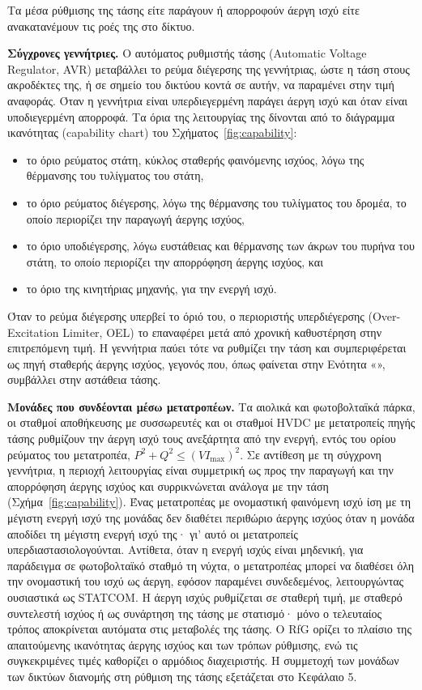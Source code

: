 Τα μέσα ρύθμισης της τάσης είτε παράγουν ή απορροφούν άεργη ισχύ είτε ανακατανέμουν τις ροές
της στο δίκτυο.

\textbf{Σύγχρονες γεννήτριες.} Ο αυτόματος ρυθμιστής τάσης (Automatic Voltage Regulator, AVR)
μεταβάλλει το ρεύμα διέγερσης της γεννήτριας, ώστε η τάση στους ακροδέκτες της, ή σε σημείο
του δικτύου κοντά σε αυτήν, να παραμένει στην τιμή αναφοράς. Όταν η γεννήτρια είναι
υπερδιεγερμένη παράγει άεργη ισχύ και όταν είναι υποδιεγερμένη απορροφά. Τα όρια της
λειτουργίας της δίνονται από το διάγραμμα ικανότητας (capability chart) του
Σχήματος~\ref{fig:capability}:

\begin{itemize}
\item το όριο ρεύματος στάτη, κύκλος σταθερής φαινόμενης ισχύος, λόγω της θέρμανσης του
      τυλίγματος του στάτη,
\item το όριο ρεύματος διέγερσης, λόγω της θέρμανσης του τυλίγματος του δρομέα, το οποίο
      περιορίζει την παραγωγή άεργης ισχύος,
\item το όριο υποδιέγερσης, λόγω ευστάθειας και θέρμανσης των άκρων του πυρήνα του στάτη, το
      οποίο περιορίζει την απορρόφηση άεργης ισχύος, και
\item το όριο της κινητήριας μηχανής, για την ενεργή ισχύ.
\end{itemize}

Όταν το ρεύμα διέγερσης υπερβεί το όριό του, ο περιοριστής υπερδιέγερσης (Over-Excitation
Limiter, OEL) το επαναφέρει μετά από χρονική καθυστέρηση στην επιτρεπόμενη τιμή. Η γεννήτρια
παύει τότε να ρυθμίζει την τάση και συμπεριφέρεται ως πηγή σταθερής άεργης ισχύος, γεγονός που,
όπως φαίνεται στην Ενότητα «», συμβάλλει στην αστάθεια τάσης.

\textbf{Μονάδες που συνδέονται μέσω μετατροπέων.} Τα αιολικά και φωτοβολταϊκά πάρκα, οι
σταθμοί αποθήκευσης με συσσωρευτές και οι σταθμοί HVDC με μετατροπείς πηγής τάσης ρυθμίζουν
την άεργη ισχύ τους ανεξάρτητα από την ενεργή, εντός του ορίου ρεύματος του μετατροπέα,
$P^2 + Q^2 \le (V I_{\max})^2$. Σε αντίθεση με τη σύγχρονη γεννήτρια, η περιοχή λειτουργίας
είναι συμμετρική ως προς την παραγωγή και την απορρόφηση άεργης ισχύος και συρρικνώνεται
ανάλογα με την τάση (Σχήμα~\ref{fig:capability}). Ένας μετατροπέας με ονομαστική φαινόμενη
ισχύ ίση με τη μέγιστη ενεργή ισχύ της μονάδας δεν διαθέτει περιθώριο άεργης ισχύος όταν η
μονάδα αποδίδει τη μέγιστη ενεργή ισχύ της· γι' αυτό οι μετατροπείς υπερδιαστασιολογούνται.
Αντίθετα, όταν η ενεργή ισχύς είναι μηδενική, για παράδειγμα σε φωτοβολταϊκό σταθμό τη νύχτα,
ο μετατροπέας μπορεί να διαθέσει όλη την ονομαστική του ισχύ ως άεργη, εφόσον παραμένει
συνδεδεμένος, λειτουργώντας ουσιαστικά ως STATCOM. Η άεργη ισχύς ρυθμίζεται σε σταθερή τιμή,
με σταθερό συντελεστή ισχύος ή ως συνάρτηση της τάσης με στατισμό· μόνο ο τελευταίος τρόπος
αποκρίνεται αυτόματα στις μεταβολές της τάσης. Ο RfG ορίζει το πλαίσιο της απαιτούμενης
ικανότητας άεργης ισχύος και των τρόπων ρύθμισης, ενώ τις συγκεκριμένες τιμές καθορίζει ο
αρμόδιος διαχειριστής. Η συμμετοχή των μονάδων των δικτύων διανομής στη ρύθμιση της τάσης
εξετάζεται στο Κεφάλαιο 5.

